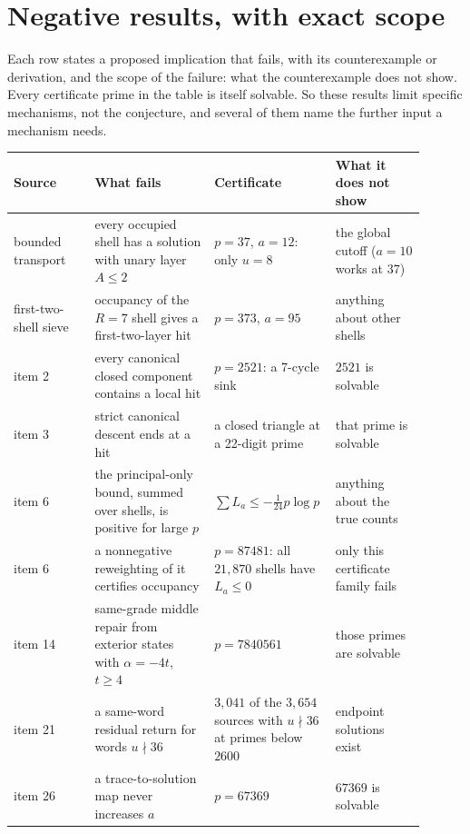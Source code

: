 \section{Negative results, with exact scope}\label{sec:negative}

Each row states a proposed implication that fails, with its counterexample or derivation, and the scope of the failure: what the counterexample does not show. Every certificate prime in the table is itself solvable. So these results limit specific mechanisms, not the conjecture, and several of them name the further input a mechanism needs.

\begin{center}\small
\begin{longtable}{@{}>{\raggedright\arraybackslash}p{0.19\linewidth}>{\raggedright\arraybackslash}p{0.29\linewidth}>{\raggedright\arraybackslash}p{0.21\linewidth}>{\raggedright\arraybackslash}p{0.21\linewidth}@{}}
\toprule
Source & What fails & Certificate & What it does not show\\
\midrule
\endhead
bounded transport & every occupied shell has a solution with unary layer $A\le2$ & $p=37$, $a=12$: only $u=8$ & the global cutoff ($a=10$ works at $37$)\\
first-two-shell sieve & occupancy of the $R=7$ shell gives a first-two-layer hit & $p=373$, $a=95$ & anything about other shells\\
item 2 & every canonical closed component contains a local hit & $p=2521$: a 7-cycle sink & $2521$ is solvable\\
item 3 & strict canonical descent ends at a hit & a closed triangle at a 22-digit prime & that prime is solvable\\
item 6 & the principal-only bound, summed over shells, is positive for large $p$ & $\sum L_a\le-\frac1{24}p\log p$ & anything about the true counts\\
item 6 & a nonnegative reweighting of it certifies occupancy & $p=87481$: all $21{,}870$ shells have $L_a\le0$ & only this certificate family fails\\
item 14 & same-grade middle repair from exterior states with $\alpha=-4t$, $t\ge4$ & $p=7840561$ & those primes are solvable\\
item 21 & a same-word residual return for words $u\nmid36$ & $3{,}041$ of the $3{,}654$ sources with $u\nmid36$ at primes below $2600$ & endpoint solutions exist\\
item 26 & a trace-to-solution map never increases $a$ & $p=67369$ & $67369$ is solvable\\

\end{longtable}
\end{center}
